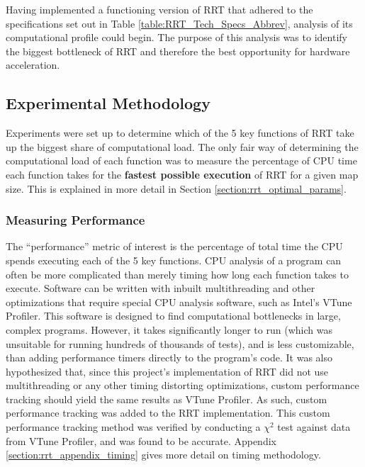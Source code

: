 
Having implemented a functioning version of \gls{RRT} that adhered to the specifications set out in Table \ref{table:RRT_Tech_Specs_Abbrev}, analysis of its computational profile could begin. The purpose of this analysis was to identify the biggest bottleneck of \gls{RRT} and therefore the best opportunity for hardware acceleration.

\subsection{Experimental Methodology}
    Experiments were set up to determine which of the 5 key functions of \gls{RRT} take up the biggest share of computational load. The only fair way of determining the computational load of each function was to measure the percentage of \gls{CPU} time each function takes for the \textbf{fastest possible execution} of \gls{RRT} for a given map size. This is explained in more detail in Section \ref{section:rrt_optimal_params}.

    \subsubsection{Measuring Performance}
        The ``performance'' metric of interest is the percentage of total time the \gls{CPU} spends executing each of the 5 key functions. CPU analysis of a program can often be more complicated than merely timing how long each function takes to execute. Software can be written with inbuilt multithreading and other optimizations that require special CPU analysis software, such as Intel's VTune Profiler\cite{Intel2019}. This software is designed to find computational bottlenecks in large, complex programs. However, it takes significantly longer to run (which was unsuitable for running hundreds of thousands of tests), and is less customizable, than adding performance timers directly to the program's code. It was also hypothesized that, since this project's implementation of \gls{RRT} did not use multithreading or any other timing distorting optimizations, custom performance tracking should yield the same results as VTune Profiler. As such, custom performance tracking was added to the \gls{RRT} implementation. This custom performance tracking method was verified by conducting a $\chi^2$ test against data from VTune Profiler, and was found to be accurate. Appendix \ref{section:rrt_appendix_timing} gives more detail on timing methodology.

